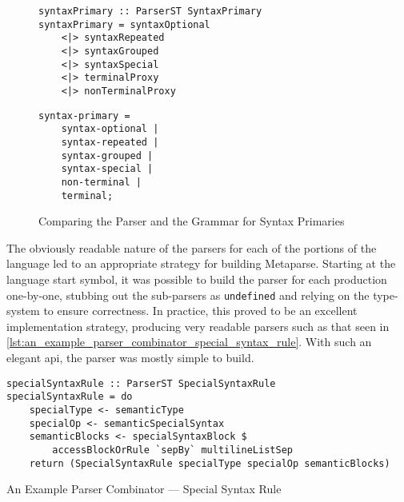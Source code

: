 \begin{figure}[!htb]
\centering
\begin{minipage}{0.65\textwidth}
\centering
\begin{verbatim}
syntaxPrimary :: ParserST SyntaxPrimary
syntaxPrimary = syntaxOptional
    <|> syntaxRepeated
    <|> syntaxGrouped
    <|> syntaxSpecial
    <|> terminalProxy
    <|> nonTerminalProxy
\end{verbatim}
\end{minipage}
\begin{minipage}{0.34\textwidth}
\centering
\begin{verbatim}
syntax-primary = 
    syntax-optional | 
    syntax-repeated |
    syntax-grouped |
    syntax-special |
    non-terminal |
    terminal;
\end{verbatim}
\end{minipage}
\caption{Comparing the Parser and the Grammar for Syntax Primaries}
\label{lst:comparing_the_parser_and_the_grammar_for_syntax_primaries}
\end{figure}

The obviously readable nature of the parsers for each of the portions of the language led to an appropriate strategy for building Metaparse.
Starting at the language start symbol, it was possible to build the parser for each production one-by-one, stubbing out the sub-parsers as \texttt{undefined} and relying on the type-system to ensure correctness.
In practice, this proved to be an excellent implementation strategy, producing very readable parsers such as that seen in \autoref{lst:an_example_parser_combinator_special_syntax_rule}.
With such an elegant \gls{api}, the parser was mostly simple to build. 

\begin{listing}[!htb]
\begin{verbatim}
specialSyntaxRule :: ParserST SpecialSyntaxRule
specialSyntaxRule = do
    specialType <- semanticType
    specialOp <- semanticSpecialSyntax
    semanticBlocks <- specialSyntaxBlock $
        accessBlockOrRule `sepBy` multilineListSep
    return (SpecialSyntaxRule specialType specialOp semanticBlocks)
\end{verbatim}
\caption{An Example Parser Combinator --- Special Syntax Rule}
\label{lst:an_example_parser_combinator_special_syntax_rule}
\end{listing}


